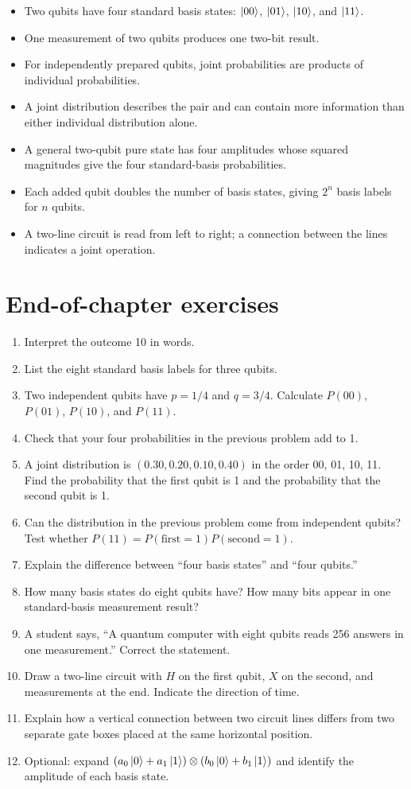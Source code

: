 \begin{itemize}
  \item Two qubits have four standard basis states: $\ket{00}$, $\ket{01}$, $\ket{10}$, and $\ket{11}$.
  \item One measurement of two qubits produces one two-bit result.
  \item For independently prepared qubits, joint probabilities are products of individual probabilities.
  \item A joint distribution describes the pair and can contain more information than either individual distribution alone.
  \item A general two-qubit pure state has four amplitudes whose squared magnitudes give the four standard-basis probabilities.
  \item Each added qubit doubles the number of basis states, giving $2^n$ basis labels for $n$ qubits.
  \item A two-line circuit is read from left to right; a connection between the lines indicates a joint operation.
\end{itemize}

\section{End-of-chapter exercises}
\label{sec:ch08-exercises}

\begin{enumerate}
  \item Interpret the outcome 10 in words.
  \item List the eight standard basis labels for three qubits.
  \item Two independent qubits have $p=1/4$ and $q=3/4$. Calculate $P(00)$, $P(01)$, $P(10)$, and $P(11)$.
  \item Check that your four probabilities in the previous problem add to 1.
  \item A joint distribution is $(0.30,0.20,0.10,0.40)$ in the order 00, 01, 10, 11. Find the probability that the first qubit is 1 and the probability that the second qubit is 1.
  \item Can the distribution in the previous problem come from independent qubits? Test whether $P(11)=P(\text{first}=1)P(\text{second}=1)$.
  \item Explain the difference between ``four basis states'' and ``four qubits.''
  \item How many basis states do eight qubits have? How many bits appear in one standard-basis measurement result?
  \item A student says, ``A quantum computer with eight qubits reads 256 answers in one measurement.'' Correct the statement.
  \item Draw a two-line circuit with $H$ on the first qubit, $X$ on the second, and measurements at the end. Indicate the direction of time.
  \item Explain how a vertical connection between two circuit lines differs from two separate gate boxes placed at the same horizontal position.
  \item Optional: expand $(a_0\ket{0}+a_1\ket{1})\otimes(b_0\ket{0}+b_1\ket{1})$ and identify the amplitude of each basis state.
\end{enumerate}
